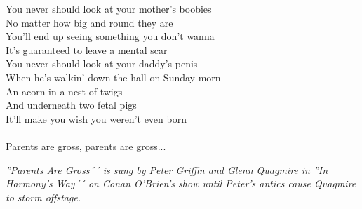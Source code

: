 \vspace{10pt}
You never should look at your mother's boobies\\
No matter how big and round they are\\
You'll end up seeing something you don't wanna\\
It's guaranteed to leave a mental scar\\
You never should look at your daddy's penis\\
When he's walkin' down the hall on Sunday morn\\
An acorn in a nest of twigs\\
And underneath two fetal pigs\\
It'll make you wish you weren't even born\\
\\
Parents are gross, parents are gross...
\par
\vspace{10pt}
{\footnotesize\textit{''Parents Are Gross´´ is sung by Peter Griffin and Glenn Quagmire in ''In Harmony's Way´´ on Conan O'Brien's show until Peter's antics cause Quagmire to storm offstage.}}
